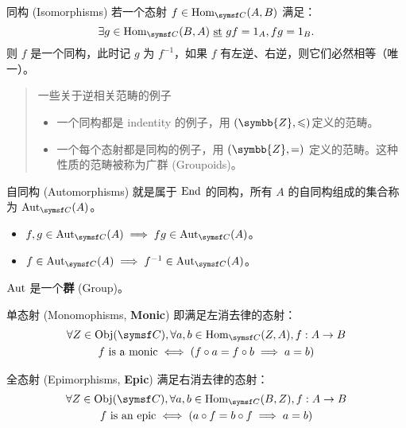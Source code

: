\begin{defi}{同构 (Isomorphisms)}
    若一个态射 \(f \in \Hom_{\symsf C}(A,B)\) 满足：
    \[
        \exists g\in \Hom_{\symsf C}(B,A) \st gf=1_A, fg=1_B
        .\]
    则 \(f\) 是一个同构，此时记 \(g\) 为 \(f^{-1} \)，如果 \(f\) 有左逆、右逆，则它们必然相等（唯一）。
\end{defi}

\begin{quote}{一些关于逆相关范畴的例子}
    \begin{itemize}
        \item 一个同构都是 indentity 的例子，用 \((\symbb{Z} ,\leqslant )\)定义的范畴。
        \item 一个每个态射都是同构的例子，用 \((\symbb{Z} ,=)\) 定义的范畴。这种性质的范畴被称为广群 (Groupoids)。
    \end{itemize}
\end{quote}

\begin{defi}{自同构 (Automorphisms)}
    就是属于 \(\operatorname{End}\) 的同构，所有 \(A\) 的自同构组成的集合称为 \(\Aut_{\symsf C}(A)\)。
    \begin{itemize}
        \item \(f,g \in\Aut_{\symsf C}(A) \implies fg\in\Aut_{\symsf C}(A)\)。
        \item \(f\in \Aut_{\symsf C}(A) \implies f^{-1} \in\Aut_{\symsf C}(A)\)。
    \end{itemize}
    \(\operatorname{Aut}\) 是一个\textbf{群} (Group)。
\end{defi}

\begin{defi}{单态射 (Monomophisms, \textbf{Monic})}
    即满足左消去律的态射：
    \begin{gather*}
        \forall Z\in \Obj(\symsf C),\forall a,b\in\Hom_{\symsf C}(Z,A),f:A\to B\\
        f \textup{ is a monic} \iff \left( f\circ a=f\circ b \implies a=b \right)
    \end{gather*}
\end{defi}

\begin{defi}{全态射 (Epimorphisms, \textbf{Epic})}
    满足右消去律的态射：
    \begin{gather*}
        \forall Z\in \Obj(\symsf C),\forall a,b\in\Hom_{\symsf C}(B,Z) ,f:A\to B\\
        f \textup{ is an epic} \iff \left( a\circ f=b\circ f \implies a=b \right)
    \end{gather*}
\end{defi}


